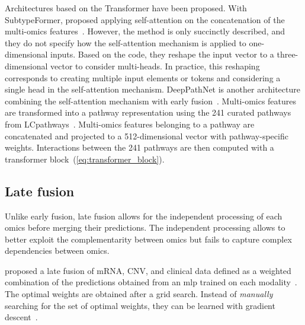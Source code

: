 \documentclass[../main.tex]{subfiles}
\begin{document}
		Architectures based on the Transformer have been proposed.
		With SubtypeFormer, \citeauthor{SubtypeFormer} proposed applying self-attention on the concatenation of the multi-omics features~\cite{SubtypeFormer}.
		However, the method is only succinctly described, and they do not specify how the self-attention mechanism is applied to one-dimensional inputs.
		Based on the code, they reshape the input vector to a three-dimensional vector to consider multi-heads.
		In practice, this reshaping corresponds to creating multiple input elements or tokens and considering a single head in the self-attention mechanism.
		DeepPathNet is another architecture combining the self-attention mechanism with early fusion~\cite{DeepPathNet}.
		Multi-omics features are transformed into a pathway representation using the 241 curated pathways from LCpathways~\cite{LCpathways}.
		Multi-omics features belonging to a pathway are concatenated and projected to a 512-dimensional vector with pathway-specific weights.
		Interactions between the 241 pathways are then computed with a transformer block~(\cref{eq:transformer_block}).

	\subsection{Late fusion}
		Unlike early fusion, late fusion allows for the independent processing of each omics before merging their predictions.
		The independent processing allows to better exploit the complementarity between omics but fails to capture complex dependencies between omics.

		\citeauthor{Sun2019} proposed a late fusion of mRNA, CNV, and clinical data defined as a weighted combination of the predictions obtained from an \gls{mlp} trained on each modality~\cite{Sun2019}.
		The optimal weights are obtained after a grid search.
		Instead of \emph{manually} searching for the set of optimal weights, they can be learned with gradient descent~\cite{CarrilloPerez2022}.
\end{document}

